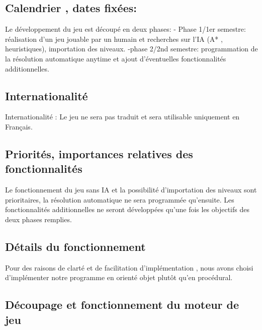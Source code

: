 \documentclass{article}
\begin{document}
		\subsection{Calendrier , dates fixées:}
		Le développement du jeu est découpé en deux phases: \newline
- Phase 1/1er semestre: réalisation d’un jeu jouable par un humain et recherches
sur l’IA (A* , heuristiques), importation des niveaux. \newline
-phase 2/2nd semestre: programmation de la résolution automatique anytime et ajout d'éventuelles fonctionnalités additionnelles.\newline
		\subsection{Internationalité}
		Internationalité :
Le jeu ne sera pas traduit et sera utilisable uniquement en Français.
		\subsection{Priorités, importances relatives des fonctionnalités}
		Le fonctionnement du jeu sans IA et la possibilité d’importation des niveaux sont prioritaires, la résolution automatique ne sera programmée qu’ensuite. Les fonctionnalités additionnelles ne seront développées qu’une fois les objectifs des deux phases remplies.
	\newpage
	\begin{center}
	\section{Détails du fonctionnement}
		\vspace{0.5cm}
		Pour des raisons de clarté et de facilitation d'implémentation , nous avons choisi d'implémenter notre programme en orienté objet plutôt qu'en procédural.
		\end{center}
		\vspace{0.5cm}
		\subsection{Découpage et fonctionnement du moteur de jeu}
		
\end{document}

